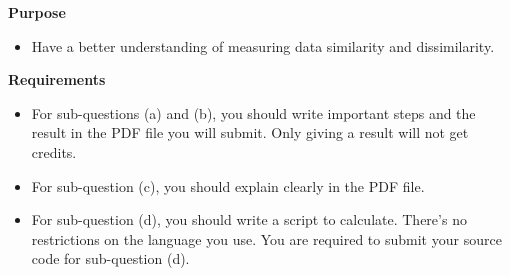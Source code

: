 \textbf{Purpose} \begin{itemize}
\item Have a better understanding of measuring data similarity and dissimilarity.
\end{itemize} 
\textbf{Requirements} 
\begin{itemize}
\item For sub-questions (a) and (b), you should write important steps and the result in the PDF file you will submit. Only giving a result will not get credits.
\item For sub-question (c), you should explain clearly in the PDF file. \item For sub-question (d), you should write a script to calculate. There's no restrictions on the language you use. You are required to submit your source code for sub-question (d). 
\end{itemize}
 
